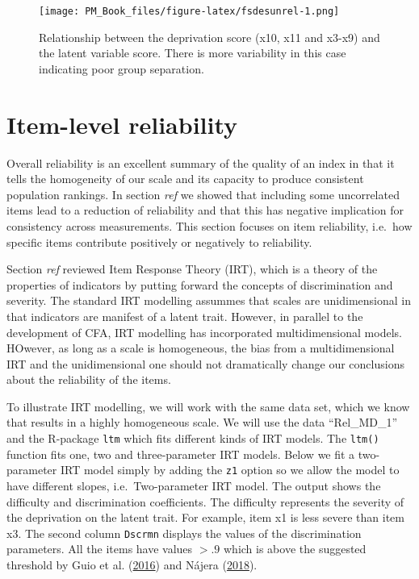 \documentclass[]{book}
\begin{document}
\begin{figure}
\centering
\texttt{[image: PM\_Book\_files/figure-latex/fsdesunrel-1.png]}
\caption{\label{fig:fsdesunrel}Relationship between the deprivation score (x10, x11 and x3-x9) and the latent variable score. There is more variability in this case indicating poor group separation.}
\end{figure}

\hypertarget{item-level-reliability}{%
\section{Item-level reliability}\label{item-level-reliability}}

Overall reliability is an excellent summary of the quality of an index in that it tells the homogeneity of our scale and its capacity to produce consistent population rankings. In section \emph{ref} we showed that including some uncorrelated items lead to a reduction of reliability and that this has negative implication for consistency across measurements. This section focuses on item reliability, i.e.~how specific items contribute positively or negatively to reliability.

Section \emph{ref} reviewed Item Response Theory (IRT), which is a theory of the properties of indicators by putting forward the concepts of discrimination and severity. The standard IRT modelling assummes that scales are unidimensional in that indicators are manifest of a latent trait. However, in parallel to the development of CFA, IRT modelling has incorporated multidimensional models. HOwever, as long as a scale is homogeneous, the bias from a multidimensional IRT and the unidimensional one should not dramatically change our conclusions about the reliability of the items.

To illustrate IRT modelling, we will work with the same data set, which we know that results in a highly homogeneous scale. We will use the data ``Rel\_MD\_1'' and the R-package \texttt{ltm} which fits different kinds of IRT models. The \texttt{ltm()} function fits one, two and three-parameter IRT models. Below we fit a two-parameter IRT model simply by adding the \texttt{z1} option so we allow the model to have different slopes, i.e.~Two-parameter IRT model. The output shows the difficulty and discrimination coefficients. The difficulty represents the severity of the deprivation on the latent trait. For example, item x1 is less severe than item x3. The second column \texttt{Dscrmn} displays the values of the discrimination parameters. All the items have values \(>.9\) which is above the suggested threshold by Guio et al. (\protect\hyperlink{ref-Guio2016}{2016}) and Nájera (\protect\hyperlink{ref-Najera2018}{2018}).
\end{document}
